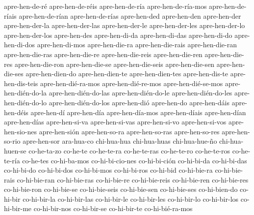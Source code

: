 {apre-hen-de-ré       
apre-hen-de-réis     
apre-hen-de-ría      
apre-hen-de-ría-mos  
apre-hen-de-ríais    
apre-hen-de-rían     
apre-hen-de-rías     
apre-hen-ded         
apre-hen-den         
apre-hen-der         
apre-hen-der-la      
apre-hen-der-las     
apre-hen-der-le      
apre-hen-der-les     
apre-hen-der-lo      
apre-hen-der-los     
apre-hen-des         
apre-hen-di-da       
apre-hen-di-das      
apre-hen-di-do       
apre-hen-di-dos      
apre-hen-di-mos      
apre-hen-die-ra      
apre-hen-die-rais    
apre-hen-die-ran     
apre-hen-die-ras     
apre-hen-die-re      
apre-hen-die-reis    
apre-hen-die-ren     
apre-hen-die-res     
apre-hen-die-ron     
apre-hen-die-se      
apre-hen-die-seis    
apre-hen-die-sen     
apre-hen-die-ses     
apre-hen-dien-do     
apre-hen-dien-te     
apre-hen-dien-tes    
apre-hen-dis-te      
apre-hen-dis-teis    
apre-hen-dié-ra-mos  
apre-hen-dié-re-mos  
apre-hen-dié-se-mos  
apre-hen-dién-do-la  
apre-hen-dién-do-las 
apre-hen-dién-do-le  
apre-hen-dién-do-les 
apre-hen-dién-do-lo  
apre-hen-dién-do-los 
apre-hen-dió         
apre-hen-do          
apre-hen-dáis        
apre-hen-déis        
apre-hen-dí          
apre-hen-día         
apre-hen-día-mos     
apre-hen-díais       
apre-hen-dían        
apre-hen-días        
apre-hen-si-va       
apre-hen-si-vas      
apre-hen-si-vo       
apre-hen-si-vos      
apre-hen-sio-nes     
apre-hen-sión        
apre-hen-so-ra       
apre-hen-so-ras      
apre-hen-so-res      
apre-hen-so-rio      
apre-hen-sor         
ara-hua-co           
chi-hua-hua          
chi-hua-huas         
chi-hua-hue-ño       
chi-hua-huen-se      
co-he-ta-zo          
co-he-te             
co-he-te-ra          
co-he-te-ras         
co-he-te-ro          
co-he-te-ros         
co-he-te-ría         
co-he-tes            
co-hi-ba-mos         
co-hi-bi-cio-nes     
co-hi-bi-ción        
co-hi-bi-da          
co-hi-bi-das         
co-hi-bi-do          
co-hi-bi-dos         
co-hi-bi-mos         
co-hi-bi-ros         
co-hi-bid            
co-hi-bie-ra         
co-hi-bie-rais       
co-hi-bie-ran        
co-hi-bie-ras        
co-hi-bie-re         
co-hi-bie-reis       
co-hi-bie-ren        
co-hi-bie-res        
co-hi-bie-ron        
co-hi-bie-se         
co-hi-bie-seis       
co-hi-bie-sen        
co-hi-bie-ses        
co-hi-bien-do        
co-hi-bir            
co-hi-bir-la         
co-hi-bir-las        
co-hi-bir-le         
co-hi-bir-les        
co-hi-bir-lo         
co-hi-bir-los        
co-hi-bir-me         
co-hi-bir-nos        
co-hi-bir-se         
co-hi-bir-te         
co-hi-bié-ra-mos     
}
